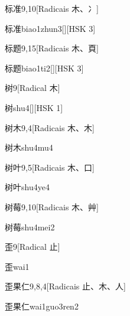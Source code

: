 \begin{entry}{标准}{9,10}[Radicais ⽊、⼎]
  \begin{phonetics}{标准}{biao1zhun3}[][HSK 3]
  \end{phonetics}
\end{entry}

\begin{entry}{标题}{9,15}[Radicais ⽊、⾴]
  \begin{phonetics}{标题}{biao1ti2}[][HSK 3]
  \end{phonetics}
\end{entry}

\begin{entry}{树}{9}[Radical ⽊]
  \begin{phonetics}{树}{shu4}[][HSK 1]
  \end{phonetics}
\end{entry}

\begin{entry}{树木}{9,4}[Radicais ⽊、⽊]
  \begin{phonetics}{树木}{shu4mu4}
  \end{phonetics}
\end{entry}

\begin{entry}{树叶}{9,5}[Radicais ⽊、⼝]
  \begin{phonetics}{树叶}{shu4ye4}
  \end{phonetics}
\end{entry}

\begin{entry}{树莓}{9,10}[Radicais ⽊、⾋]
  \begin{phonetics}{树莓}{shu4mei2}
  \end{phonetics}
\end{entry}

\begin{entry}{歪}{9}[Radical ⽌]
  \begin{phonetics}{歪}{wai1}
  \end{phonetics}
\end{entry}

\begin{entry}{歪果仁}{9,8,4}[Radicais ⽌、⽊、⼈]
  \begin{phonetics}{歪果仁}{wai1guo3ren2}
  \end{phonetics}
\end{entry}

